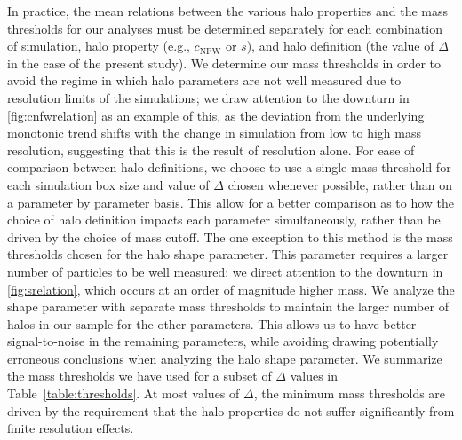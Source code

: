 \documentclass[usenatbib]{mnras}
\begin{document}
In practice, the mean relations between the various halo properties and the mass thresholds for our analyses 
must be determined separately for each combination of simulation, 
halo property (e.g., $c_{\mathrm{NFW}}$ or $s$), 
and halo definition (the value of $\Delta$ in the case of the present study). 
We determine our mass thresholds in order to avoid the regime in which halo parameters
are not well measured due to resolution limits of the simulations; we draw attention to the
downturn in \ref{fig:cnfwrelation} as an example of this, as the deviation from
the underlying monotonic trend shifts with the change in simulation from low to high mass resolution,
suggesting that this is the result of resolution alone. For ease of comparison
between halo definitions, we choose to use a single mass threshold for each
simulation box size and value of $\Delta$ chosen whenever possible, rather than on a parameter by
parameter basis. This allow for a better comparison as to how the choice of halo
definition impacts each parameter simultaneously, rather than be driven by the
choice of mass cutoff. The one exception to this method is the mass thresholds chosen
for the halo shape parameter. This parameter requires a larger number of particles to be
well measured; we direct attention to the downturn in \ref{fig:srelation}, which occurs at
an order of magnitude higher mass. We analyze the shape parameter with separate mass thresholds
to maintain the larger number of halos in our sample for the other parameters. This allows us
to have better signal-to-noise in the remaining parameters, while avoiding drawing potentially
erroneous conclusions when analyzing the halo shape parameter.
We summarize the mass thresholds we have used for a 
subset of $\Delta$ values in Table~\ref{table:thresholds}. 
At most values of $\Delta$, the minimum mass thresholds are 
driven by the requirement that the halo properties do 
not suffer significantly from finite resolution effects.


\end{document}
